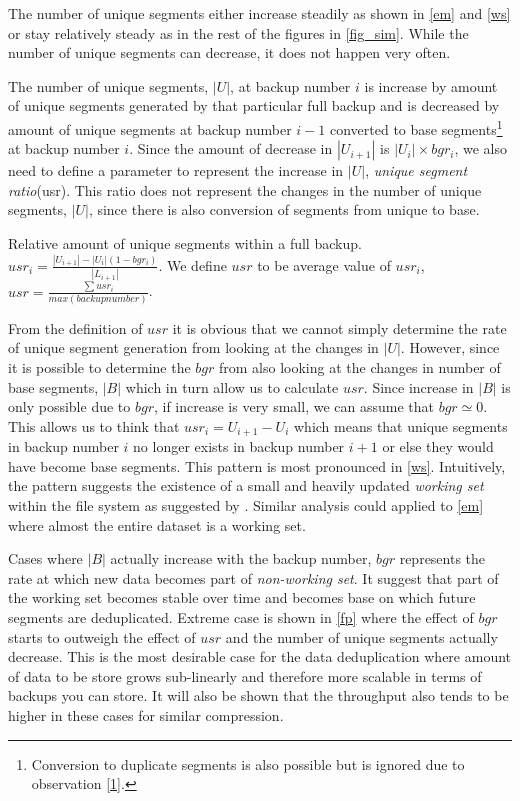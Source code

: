\begin{observation}\label{3}
The number of unique segments either increase steadily as shown in \figurename \ref{em} and \figurename \ref{ws} or stay relatively steady as in the rest of the figures in \figurename \ref{fig_sim}. While the number of unique segments can decrease, it does not happen very often.
\end{observation}

The number of unique segments, $|U|$, at backup number $i$ is increase by amount of unique segments generated by that particular full backup and is decreased by amount of unique segments at backup number $i-1$ converted to base segments\footnote{Conversion to duplicate segments is also possible but is ignored due to observation \ref{1}.} at backup number $i$. Since the amount of decrease in $|U_{i+1}|$ is $|U_i|\times bgr_i$, we also need to define a parameter to represent the increase in $|U|$, \emph{unique segment ratio}(usr). This ratio does not represent the changes in the number of unique segments, $|U|$, since there is also conversion of segments from unique to base.

\begin{definition}
Relative amount of unique segments within a full backup. $usr_i = \frac{|U_{i+1}|-|U_i|(1-bgr_i)}{|L_{i+1}|}$. We define $\mathit{usr}$ to be average value of $usr_i$, $usr = \frac{\sum usr_i}{max(backup number)}$.
\end{definition}

From the definition of $\mathit{usr}$ it is obvious that we cannot simply determine the rate of unique segment generation from looking at the changes in $|U|$. However, since it is possible to determine the $bgr$ from also looking at the changes in number of base segments, $|B|$ which in turn allow us to calculate $\mathit{usr}$. Since increase in $|B|$ is only possible due to $bgr$, if increase is very small, we can assume that $bgr\simeq0$. This allows us to think that $usr_i=U_{i+1}-U_i$ which means that unique segments in backup number $i$ no longer exists in backup number $i+1$ or else they would have become base segments. This pattern is most pronounced in \figurename \ref{ws}. Intuitively, the pattern suggests the existence of a small and heavily updated \emph{working set} within the file system as suggested by \cite{soundararajan2010extending}. Similar analysis could applied to \figurename \ref{em} where almost the entire dataset is a working set. 

Cases where $|B|$ actually increase with the backup number, $bgr$ represents the rate at which new data becomes part of \emph{non-working set}. It suggest that part of the working set becomes stable over time and becomes base on which future segments are deduplicated. Extreme case is shown in \figurename \ref{fp} where the effect of $bgr$ starts to outweigh the effect of $\mathit{usr}$ and the number of unique segments actually decrease. This is the most desirable case for the data deduplication where amount of data to be store grows sub-linearly and therefore more scalable in terms of backups you can store. It will also be shown that the throughput also tends to be higher in these cases for similar compression.

